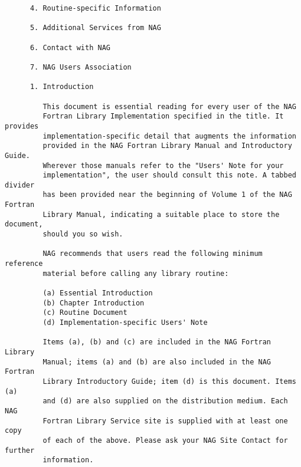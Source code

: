 \begin{small}
\begin{verbatim}
      4. Routine-specific Information                                           
                                                                                
      5. Additional Services from NAG                                           
                                                                                
      6. Contact with NAG                                                       
                                                                                
      7. NAG Users Association                                                  
                                                                                
      1. Introduction                                                           
                                                                                
         This document is essential reading for every user of the NAG           
         Fortran Library Implementation specified in the title. It provides     
         implementation-specific detail that augments the information           
         provided in the NAG Fortran Library Manual and Introductory Guide.     
         Wherever those manuals refer to the "Users' Note for your              
         implementation", the user should consult this note. A tabbed divider   
         has been provided near the beginning of Volume 1 of the NAG Fortran    
         Library Manual, indicating a suitable place to store the document,     
         should you so wish.                                                    
                                                                                
         NAG recommends that users read the following minimum reference         
         material before calling any library routine:                           
                                                                                
         (a) Essential Introduction                                             
         (b) Chapter Introduction                                               
         (c) Routine Document                                                   
         (d) Implementation-specific Users' Note                                
                                                                                
         Items (a), (b) and (c) are included in the NAG Fortran Library         
         Manual; items (a) and (b) are also included in the NAG Fortran         
         Library Introductory Guide; item (d) is this document. Items (a)       
         and (d) are also supplied on the distribution medium. Each NAG         
         Fortran Library Service site is supplied with at least one copy        
         of each of the above. Please ask your NAG Site Contact for further     
         information.                                                           
                                                                                

\end{verbatim}
\end{small}

